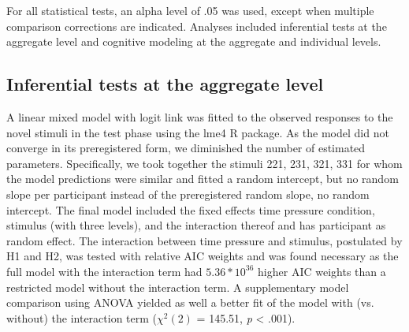 \documentclass[a4paper,man,natbib]{apa6}
\begin{document}
For all statistical tests, an alpha level of .05 was used, except when multiple comparison corrections are indicated. Analyses included inferential tests at the aggregate level and cognitive modeling at the aggregate and individual levels.

\subsection{Inferential tests at the aggregate level}
A linear mixed model with logit link was fitted to the observed responses to the novel stimuli in the test phase using the lme4 R package. As the model did not converge in its preregistered form, we diminished the number of estimated parameters. Specifically, we took together the stimuli 221, 231, 321, 331 for whom the model predictions were similar and fitted a random intercept, but no random slope per participant instead of the preregistered random slope, no random intercept. The final model included the fixed effects time pressure condition, stimulus (with three levels), and the interaction thereof and has participant as random effect. The interaction between time pressure and stimulus, postulated by H1 and H2, was tested with relative AIC weights  and was found necessary as the full model with the interaction term had $5.36 * 10^{36}$ higher AIC weights than a restricted model without the interaction term. A supplementary model comparison using ANOVA yielded as well a better fit of the model with (vs. without) the interaction term ($\chi^{2}(2)$ = 145.51, \textit{p} < .001). 
\end{document}
